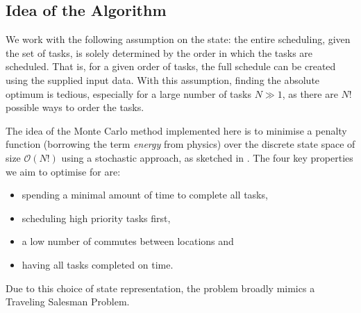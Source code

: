 \subsection{Idea of the Algorithm}
We work with the following assumption on the state: the entire scheduling, given the set of tasks, is solely determined by the order in which the tasks are scheduled.
That is, for a given order of tasks, the full schedule can be created using the supplied input data.
With this assumption, finding the absolute optimum is tedious, especially for a large number of tasks $N \gg 1$, as there are $N!$ possible ways to order the tasks.

The idea of the Monte Carlo method implemented here is to minimise a penalty function (borrowing the term \textit{energy} from physics) over the discrete state space of size $\mathcal{O}(N!)$ using a stochastic approach, as sketched in .
The four key properties we aim to optimise for are:
\begin{itemize}
  \tightlist
  \item spending a minimal amount of time to complete all tasks,
  \item scheduling high priority tasks first,
  \item a low number of commutes between locations and
  \item having all tasks completed on time.
\end{itemize}
Due to this choice of state representation, the problem broadly mimics a Traveling Salesman Problem.
